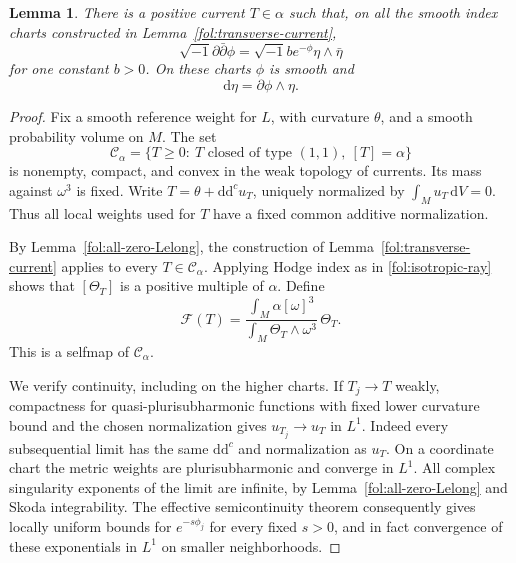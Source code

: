 \documentclass[11pt,letterpaper]{article}
\newcommand{\dd}{\mathrm{d}}
\newcommand{\ii}{\sqrt{-1}}
\newcommand{\ddc}{\mathrm{d}\mathrm{d}^{c}}
\newtheorem{lemma}[theorem]{Lemma}
\theoremstyle{definition}
\theoremstyle{remark}
\begin{document}
\begin{lemma}\label{fol:fixed-point}
There is a positive current $T\in\alpha$ such that, on all the smooth
index charts constructed in Lemma~\ref{fol:transverse-current},
\begin{equation}\label{fol:fixed-point-equation}
 \ii\partial\bar\partial\phi
 =\ii b e^{-\phi}\eta\wedge\bar\eta
\end{equation}
for one constant $b>0$.  On these charts $\phi$ is smooth and
\begin{equation}\label{fol:eta-derivative}
 \dd\eta=\partial\phi\wedge\eta.
\end{equation}
\end{lemma}

\begin{proof}
Fix a smooth reference weight for $L$, with curvature $\theta$, and a
smooth probability volume on $M$.  The set
\[
 \mathcal C_\alpha=
 \{T\geq0:\ T\text{ closed of type }(1,1),\ [T]=\alpha\}
\]
is nonempty, compact, and convex in the weak topology of currents.
Its mass against $\omega^3$ is fixed.  Write
$T=\theta+\ddc u_T$, uniquely normalized by
$\int_Mu_T\,\dd V=0$.  Thus all local weights used for $T$ have
a fixed common additive normalization.

By Lemma~\ref{fol:all-zero-Lelong}, the construction of
Lemma~\ref{fol:transverse-current} applies to every $T\in\mathcal C_\alpha$.
Applying Hodge index as in \eqref{fol:isotropic-ray} shows that
$[\Theta_T]$ is a positive multiple of $\alpha$.  Define
\begin{equation}\label{fol:fixed-point-map}
 \mathcal F(T)=
 \frac{\int_M\alpha[\omega]^3}{\int_M\Theta_T\wedge\omega^3}\,\Theta_T.
\end{equation}
This is a selfmap of $\mathcal C_\alpha$.

We verify continuity, including on the higher charts.  If $T_j\to T$
weakly, compactness for quasi-plurisubharmonic functions with fixed lower
curvature bound and the chosen normalization gives
$u_{T_j}\to u_T$ in $L^1$.  Indeed every subsequential limit has the same
$\ddc$ and normalization as $u_T$.  On a coordinate chart the metric
weights are plurisubharmonic and converge in $L^1$.
All complex singularity exponents of the limit are infinite, by
Lemma~\ref{fol:all-zero-Lelong} and Skoda integrability.
The effective semicontinuity theorem
\cite[Theorem~0.2(2)]{DemaillyKollar} consequently gives locally uniform
bounds for $e^{-s\phi_j}$ for every fixed $s>0$, and in fact convergence
of these exponentials in $L^1$ on smaller neighborhoods.


\end{proof}
\end{document}

